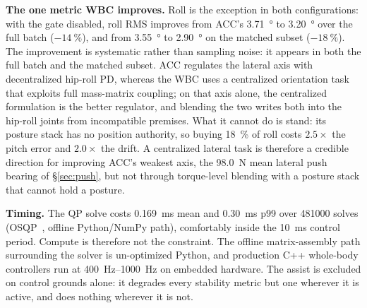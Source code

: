 \documentclass[conference]{IEEEtran}
\begin{document}
\medskip\noindent\textbf{The one metric WBC improves.}
Roll is the exception in both configurations: with the gate disabled, roll RMS improves from ACC's \SI{3.71}{\degree} to \SI{3.20}{\degree} over the full batch ($-\SI{14}{\percent}$), and from \SI{3.55}{\degree} to \SI{2.90}{\degree} on the matched subset ($-\SI{18}{\percent}$).
The improvement is systematic rather than sampling noise: it appears in both the full batch and the matched subset.
ACC regulates the lateral axis with decentralized hip-roll PD, whereas the WBC uses a centralized orientation task that exploits full mass-matrix coupling; on that axis alone, the centralized formulation is the better regulator, and blending the two writes both into the hip-roll joints from incompatible premises.
What it cannot do is stand: its posture stack has no position authority, so buying \SI{18}{\percent} of roll costs $\num{2.5}\times$ the pitch error and $\num{2.0}\times$ the drift.
A centralized lateral task is therefore a credible direction for improving ACC's weakest axis, the \SI{98.0}{N} mean lateral push bearing of \S\ref{sec:push}, but not through torque-level blending with a posture stack that cannot hold a posture.

\medskip\noindent\textbf{Timing.}
The QP solve costs \SI{0.169}{ms} mean and \SI{0.30}{ms} p99 over \num{481000} solves (OSQP~\cite{stellato2020osqp}, offline Python/NumPy path), comfortably inside the \SI{10}{ms} control period.
Compute is therefore not the constraint. The offline matrix-assembly path
surrounding the solver is un-optimized Python, and production C++ whole-body
controllers run at \SIrange{400}{1000}{Hz} on embedded hardware.
The assist is excluded on control grounds alone: it degrades every stability metric but one wherever it is active, and does nothing wherever it is not.
\end{document}
